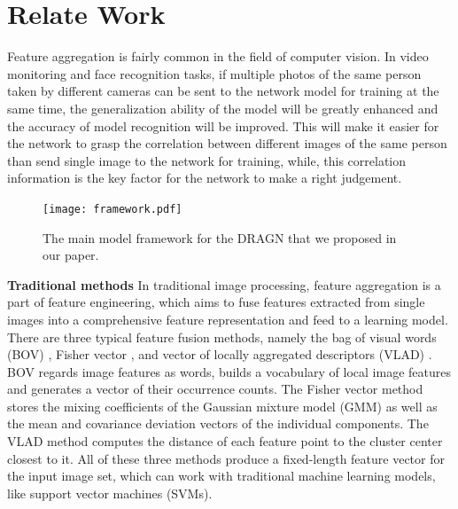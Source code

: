 \documentclass[10pt,twocolumn,letterpaper]{article}
\begin{document}
\section{Relate Work}
Feature aggregation is fairly common in the field of computer vision. In video monitoring and face recognition tasks, if multiple photos of the same person taken by different cameras can be sent to the network model for training at the same time, the generalization ability of the model will be greatly enhanced and the accuracy of model recognition will be improved. This will make it easier for the network to grasp the correlation between different images of the same person than send single image to the network for training, while, this correlation information is the key factor for the network to make a right judgement.

\begin{figure}
\begin{center}
\texttt{[image: framework.pdf]}
\end{center}
   \caption{The main model framework for the DRAGN that we proposed in our paper.}
\label{fig:short}
\end{figure}

\textbf{Traditional methods} 
In traditional image processing, feature aggregation is a part of feature engineering, which aims to fuse features extracted from single images into a comprehensive feature representation and feed to a learning model. There are three typical feature fusion methods, namely the bag of visual words (BOV) \cite{bov}, Fisher vector \cite{fishervector}, and vector of locally aggregated descriptors (VLAD) \cite{vlad}. BOV regards image features as words, builds a vocabulary of local image features and generates a vector of their occurrence counts. The Fisher vector method stores the mixing coefficients of the Gaussian mixture model (GMM) as well as the mean and covariance deviation vectors of the individual components. The VLAD method computes the distance of each feature point to the cluster center closest to it. All of these three methods produce a fixed-length feature vector for the input image set, which can work with traditional machine learning models, like support vector machines (SVMs).
\end{document}
